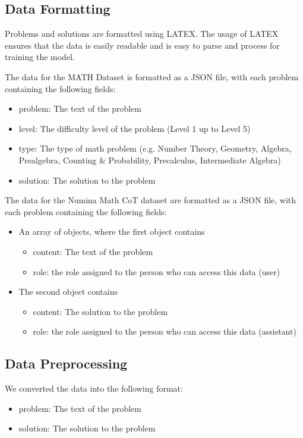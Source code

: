 \documentclass{article}
\begin{document}
\subsection{Data Formatting}

Problems and solutions are formatted using LATEX. The usage of LATEX ensures that the data is easily readable and is easy to parse and process for training the model.

The data for the MATH Dataset is formatted as a JSON file, with each problem containing the following fields:
\begin{itemize}
  \item problem: The text of the problem
  \item level: The difficulty level of the problem (Level 1 up to Level 5)
  \item type: The type of math problem (e.g. Number Theory, Geometry, Algebra, Prealgebra, Counting \& Probability, Precalculus, Intermediate Algebra)
  \item solution: The solution to the problem
\end{itemize}

The data for the Numina Math CoT dataset are formatted as a JSON file, with each problem containing the following fields:
\begin{itemize}
  \item An array of objects, where the first object contains
      \begin{itemize}
        \item content: The text of the problem
        \item role: the role assigned to the person who can access this data (user)
      \end{itemize}
  \item The second object contains
      \begin{itemize}
        \item content: The solution to the problem
        \item role: the role assigned to the person who can access this data (assistant)
      \end{itemize}
\end{itemize}

\subsection{Data Preprocessing}

We converted the data into the following format:
\begin{itemize}
  \item problem: The text of the problem
  \item solution: The solution to the problem
\end{itemize}
\end{document}
